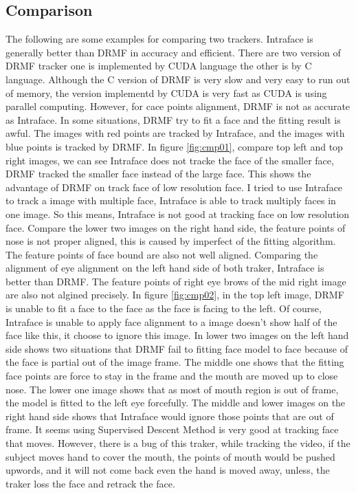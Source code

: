 \subsection{Comparison}
The following are some examples for comparing two trackers. Intraface is generally better than DRMF in accuracy and efficient. There are two version of DRMF tracker one is implemented by CUDA language the other is by C language. Although the C version of DRMF is very slow and very easy to run out of memory, the version implementd by CUDA is very fast as CUDA is using parallel computing. However, for cace points alignment, DRMF is not as accurate as Intraface. In some situations, DRMF try to fit a face and the fitting result is awful. The images with red points are tracked by Intraface, and the images with blue points is tracked by DRMF.
\newline
In figure \ref{fig:cmp01}, compare top left and top right images, we can see Intraface does not tracke the face of the smaller face, DRMF tracked the smaller face instead of the large face. This shows the advantage of DRMF on track face of low resolution face. I tried to use Intraface to track a image with multiple face, Intraface is able to track multiply faces in one image. So this means, Intraface is not good at tracking face on low resolution face. Compare the lower two images on the right hand side, the feature points of nose is not proper aligned, this is caused by imperfect of the fitting algorithm. The feature points of face bound are also not well aligned. Comparing the alignment of eye alignment on the left hand side of both traker, Intraface is better than DRMF. The feature points of right eye brows of the mid right image are also not algined precisely.
\newline
In figure \ref{fig:cmp02}, in the top left image, DRMF is unable to fit a face to the face as the face is facing to the left. Of course, Intraface is unable to apply face alignment to a image doesn't show half of the face like this, it choose to ignore this image. In lower two images on the left hand side shows two situations that DRMF fail to fitting face model to face because of the face is partial out of the image frame. The middle one shows that the fitting face points are force to stay in the frame and the mouth are moved up to close nose. The lower one image shows that as most of mouth region is out of frame, the model is fitted to the left eye forcefully. The middle and lower images on the right hand side shows that Intraface would ignore those points that are out of frame. It seems using Supervised Descent Method is very good at tracking face that moves. However, there is a bug of this traker, while tracking the video, if the subject moves hand to cover the mouth, the points of mouth would be pushed upwords, and it will not come back even the hand is moved away, unless, the traker loss the face and retrack the face.
